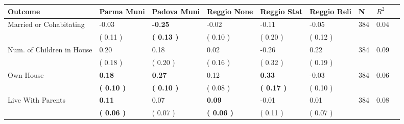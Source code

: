 \begin{tabular}{L{6.2cm} C{1.8cm} C{1.8cm} C{1.8cm} C{1.8cm} C{1.8cm} C{1.8cm} C{0.3cm} C{0.3cm}}
\toprule
 \textbf{Outcome} & \textbf{Parma Muni} & \textbf{Padova Muni} & \textbf{Reggio None} & \textbf{Reggio Stat} & \textbf{Reggio Reli} & \textbf{N} & \textbf{$ R^2$} \\
\midrule
Married or Cohabitating &     -0.03 & \textbf{    -0.25} &     -0.02 &     -0.11 &     -0.05  & 384 &       0.04 \\ 
 & (     0.11 ) & \textbf{(     0.13 )} & (     0.10 ) & (     0.20 ) & (     0.12 )  & \\
Num. of Children in House &      0.20 &      0.18 &      0.02 &     -0.26 &      0.22  & 384 &       0.09 \\ 
 & (     0.18 ) & (     0.20 ) & (     0.16 ) & (     0.32 ) & (     0.19 )  & \\
Own House & \textbf{     0.18} & \textbf{     0.27} &      0.12 & \textbf{     0.33} &     -0.03  & 384 &       0.06 \\ 
 & \textbf{(     0.10 )} & \textbf{(     0.10 )} & (     0.08 ) & \textbf{(     0.17 )} & (     0.10 )  & \\
Live With Parents & \textbf{     0.11} &      0.07 & \textbf{     0.09} &     -0.01 &      0.01  & 384 &       0.08 \\ 
 & \textbf{(     0.06 )} & (     0.07 ) & \textbf{(     0.06 )} & (     0.11 ) & (     0.07 )  & \\
\bottomrule
\end{tabular}

